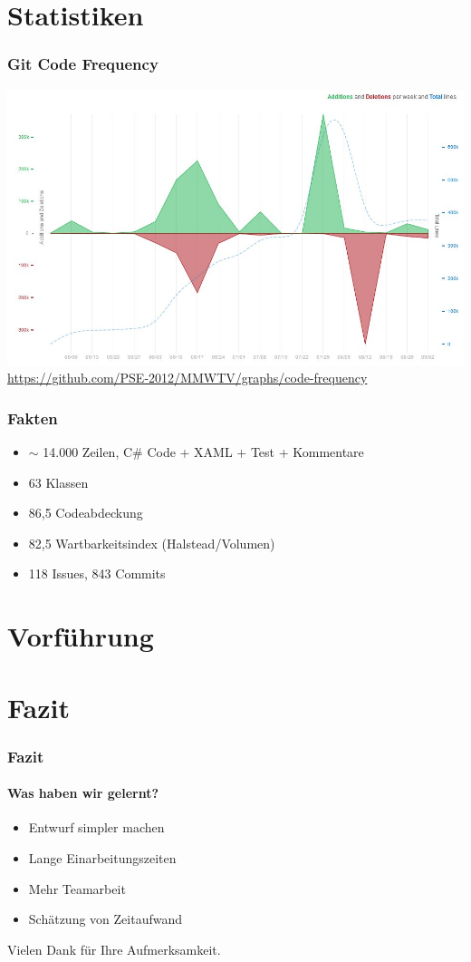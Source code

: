 \documentclass[t]{beamer}
\begin{document}
\section{Statistiken}
\begin{frame}
	\frametitle{Git Code Frequency}
	\includegraphics[scale=.33]{img/GitCodeFrequency.jpg}\\
	\hyperlink{Git Code Frequency}{https://github.com/PSE-2012/MMWTV/graphs/code-frequency}
\end{frame}
\begin{frame}
	\frametitle{Fakten}
	\begin{itemize}
	\item <+-> \begin{math}\sim\end{math} 14.000 Zeilen, C\# Code + XAML + Test + Kommentare
	\item <+-> 63 Klassen
	\item <+-> 86,5 Codeabdeckung
	\item <+-> 82,5 Wartbarkeitsindex (Halstead/Volumen)
	\item <+-> 118 Issues, 843 Commits 
	\end{itemize}
\end{frame}
\section{Vorführung}
\section{Fazit}
\begin{frame}
	\frametitle{Fazit}
	\framesubtitle{Was haben wir gelernt?}
	\begin{itemize}
	\item <+-> Entwurf simpler machen
	\item <+-> Lange Einarbeitungszeiten
	\item <+-> Mehr Teamarbeit
	\item <+-> Schätzung von Zeitaufwand
	\end{itemize}
\end{frame}
\begin{frame}[c]
	Vielen Dank für Ihre Aufmerksamkeit.
\end{frame}
\end{document}
